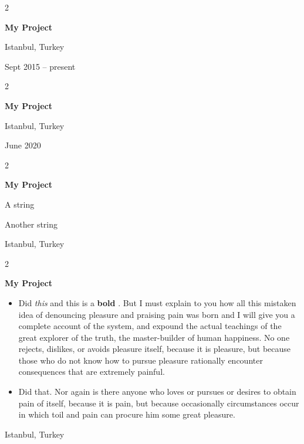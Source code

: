 \documentclass[10pt, letterpaper]{article}
\newenvironment{summary}{
    \begin{description}[
        topsep=0.10 cm,
        parsep=0.10 cm,
        partopsep=0pt,
        itemsep=0pt,
        leftmargin=0.4 cm + 10pt
    ]
}{
    \end{description}
} %
\newenvironment{highlights}{
    \begin{itemize}[
        topsep=0.10 cm,
        parsep=0.10 cm,
        partopsep=0pt,
        itemsep=0pt,
        leftmargin=0.4 cm + 10pt
    ]
}{
    \end{itemize}
} %
\newenvironment{twocolentry}[2][]{
    \onecolentry
    \def\secondColumn{#2}
    \setcolumnwidth{\fill, 4.5 cm}
    \begin{paracol}{2}
}{
    \switchcolumn \raggedleft \secondColumn
    \end{paracol}
    \endonecolentry
} %
\let\hrefWithoutArrow\href
\renewcommand{\href}[2]{\hrefWithoutArrow{#1}{\ifthenelse{\equal{#2}{}}{ }{#2 }\raisebox{.15ex}{\footnotesize \faExternalLink*}}}
\begin{document}
        \vspace{0.2 cm}

        \begin{twocolentry}{
            Istanbul, Turkey

        Sept 2015 – present
        }
            \textbf{My Project}
        \end{twocolentry}


        \vspace{0.2 cm}

        \begin{twocolentry}{
            Istanbul, Turkey

        June 2020
        }
            \textbf{My Project}
        \end{twocolentry}


        \vspace{0.2 cm}

        \begin{twocolentry}{
            Istanbul, Turkey
        }
            \textbf{My Project}
            \begin{summary}
                \item A string
                \item Another string
            \end{summary}
        \end{twocolentry}


        \vspace{0.2 cm}

        \begin{twocolentry}{
            Istanbul, Turkey
        }
            \textbf{My Project}
            \begin{highlights}
                \item Did \textit{this} and this is a \textbf{bold} \href{https://example.com}{link}. But I must explain to you how all this mistaken idea of denouncing pleasure and praising pain was born and I will give you a complete account of the system, and expound the actual teachings of the great explorer of the truth, the master-builder of human happiness. No one rejects, dislikes, or avoids pleasure itself, because it is pleasure, but because those who do not know how to pursue pleasure rationally encounter consequences that are extremely painful.
                \item Did that. Nor again is there anyone who loves or pursues or desires to obtain pain of itself, because it is pain, but because occasionally circumstances occur in which toil and pain can procure him some great pleasure.
            \end{highlights}
        \end{twocolentry}
\end{document}
